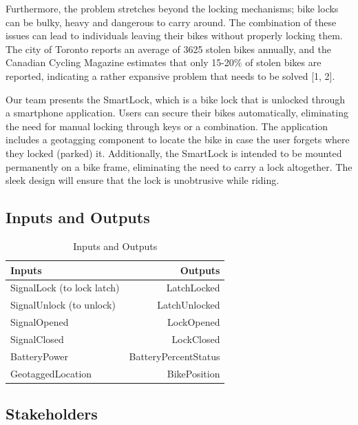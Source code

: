 \documentclass{article}
\begin{document}
Furthermore, the problem stretches beyond the locking mechanisms; bike locks can be bulky, heavy and dangerous to carry around.  The combination of these issues can lead to individuals leaving their bikes without properly locking them.  The city of Toronto reports an average of 3625 stolen bikes annually, and the Canadian Cycling Magazine estimates that only 15-20\% of stolen bikes are reported, indicating a rather expansive problem that needs to be solved [1, 2]. 

Our team presents the SmartLock, which is a bike lock that is unlocked through a smartphone application.  Users can secure their bikes automatically, eliminating the need for manual locking through keys or a combination.  The application includes a geotagging component to locate the bike in case the user forgets where they locked (parked) it.  Additionally, the SmartLock is intended to be mounted permanently on a bike frame, eliminating the need to carry a lock altogether.  The sleek design will ensure that the lock is unobtrusive while riding. 


\subsection{Inputs and Outputs}

\begin{table}[hp]
  \begin{center}
  \caption{Inputs and Outputs} \label{TblTInputsAndOutputs}
    \begin{tabular}{| l | r |}
    \hline
      \textbf{Inputs} & \textbf{Outputs}\\
      \hline
      SignalLock (to lock latch)  & LatchLocked\\
	    SignalUnlock (to unlock) & LatchUnlocked\\
	    SignalOpened & LockOpened\\
	    SignalClosed & LockClosed\\
	    BatteryPower & BatteryPercentStatus\\
	    GeotaggedLocation & BikePosition\\
	    \hline
    \end{tabular}
  \end{center}
\end{table}

\subsection{Stakeholders}
\end{document}
